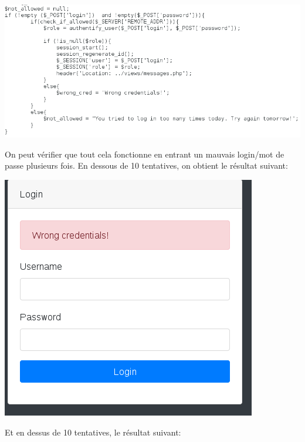 \documentclass{article}
\begin{document}
\includegraphics[width=\textwidth]{images/tentative_login.PNG}

On peut vérifier que tout cela fonctionne en entrant un mauvais
login/mot de passe plusieurs fois. En dessous de 10 tentatives, on
obtient le résultat suivant:

\includegraphics[width=\textwidth]{images/tentative_moins_10.PNG}

Et en dessus de 10 tentatives, le résultat suivant:
\end{document}
